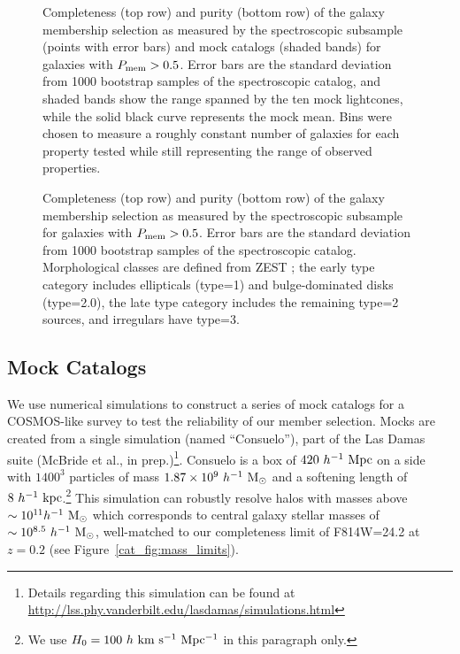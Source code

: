 \begin{figure}
\caption{Completeness (top row) and purity (bottom row) of the galaxy
  membership selection as measured by the
  spectroscopic subsample (points with error bars) and mock catalogs
  (shaded bands) for galaxies with $P_{\rm mem}>0.5$. Error bars are
  the standard deviation from 1000 bootstrap samples of the
  spectroscopic catalog, and shaded bands show the range spanned by the
  ten mock lightcones, while the solid black curve represents the mock
  mean. Bins were chosen to measure a roughly constant number of galaxies for each 
  property tested while still representing the range of observed properties.}
\label{cat_fig:memstat_all}
\end{figure}

\begin{figure}
\caption{Completeness (top row) and purity (bottom row) of the galaxy
  membership selection as measured by the
  spectroscopic subsample for galaxies with $P_{\rm mem}>0.5$. Error bars are
  the standard deviation from 1000 bootstrap samples of the
  spectroscopic catalog. Morphological classes are defined from ZEST
  \citep{Scarlata2007}; the early type category includes ellipticals
  (type=1) and bulge-dominated disks (type=2.0), the late type
  category includes the remaining type=2 sources, and irregulars
  have type=3.} 
\label{cat_fig:memstat_color}
\end{figure}

\subsection{Mock Catalogs}
\label{cat_s:mocks}

We use numerical simulations to construct a series of mock catalogs for a
COSMOS-like survey to test the reliability of our member
selection. Mocks are created from a single simulation (named 
``Consuelo''), part of the Las Damas suite (McBride et al., in prep.)\footnote{Details regarding this simulation can be found at {\url{http://lss.phy.vanderbilt.edu/lasdamas/simulations.html}}}. Consuelo
is a box of $420~h^{-1}~{\rm Mpc}$ on a side with 
$1400^3$ particles of mass $1.87 \times 10^9~h^{-1}~{\rm M}_{\odot}$
and a softening length of $8~h^{-1}~{\rm kpc}$.\footnote{We use
  $H_0=100~h~\rm{km~s^{-1}~Mpc^{-1}}$ in this paragraph only.} 
This simulation can robustly resolve halos with masses above
$\sim10^{11} h^{-1}~{\rm M_{\odot}}$ which corresponds to central
galaxy stellar masses of $\sim10^{8.5}~h^{-1}~{\rm M_{\odot}}$, well-matched
to our completeness limit of F814W=24.2 at $z=0.2$ (see
Figure~\ref{cat_fig:mass_limits}).

